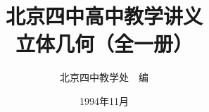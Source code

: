 \documentclass[b5paper, openany]{ctexbook}
\theoremstyle{plain}
\begin{document}
\title{\Huge\bfseries 北京四中高中教学讲义\\立体几何（全一册）}



\author{\Large 北京四中教学处~~编}
\date{\Large 1994年11月}

\maketitle




\frontmatter


\tableofcontents


\mainmatter

 

 
 

 



 
\backmatter
\end{document}
